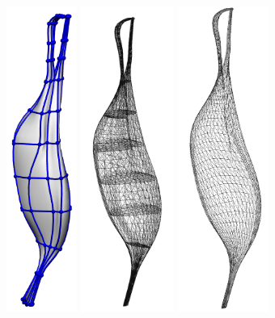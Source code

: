 \begin{figure}%
  \centering%
  \includegraphics[height=10cm]{images/fiber_creation/exfile.png}\quad%
  \includegraphics[height=10cm]{images/fiber_creation/biceps23.png}%
  \includegraphics[height=10cm]{images/fiber_creation/biceps22.png}%

\end{figure}

